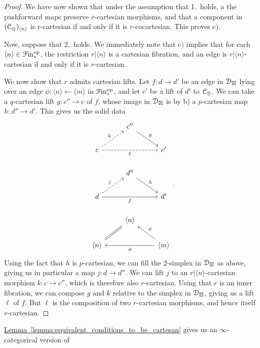 \documentclass[main.tex]{subfiles}
\begin{document}
\begin{proof}
  We have now shown that under the assumption that 1.\ holds, a the pushforward maps preserve $r$-cartesian morphisms, and that a component in $(\mathcal{C}_{\otimes})_{\langle n \rangle}$ is $r$-cartesian if and only if it is $r$-cocartesian. This proves c).

  Now, suppose that 2.\ holds. We immediately note that c) implies that for each $\langle n \rangle \in \mathcal{F}\mathrm{in}_{*}^{\mathrm{op}}$, the restriction $r|\langle n \rangle$ is a cartesian fibration, and an edge is $r|\langle n \rangle$-cartesian if and only if it is $r$-cartesian.

  We now show that $r$ admits cartesian lifts. Let $f\colon d \to d'$ be an edge in $\mathcal{D}_{\boxtimes}$ lying over an edge $\phi\colon \langle n \rangle \leftarrow \langle m \rangle$ in $\mathcal{F}\mathrm{in}_{*}^{\mathrm{op}}$, and let $c'$ be a lift of $d'$ to $\mathcal{C}_{\otimes}$. We can take a $q$-cartesian lift $g\colon c'' \to c$ of $f$, whose image in $\mathcal{D}_{\boxtimes}$ is by b) a $p$-cartesian map $h\colon d'' \to d'$. This gives us the solid data
  \begin{equation*}
    \begin{tikzcd}
      & c''
      \arrow[dr, "g"]
      \\
      c
      \arrow[ur, dashed, "k"]
      \arrow[rr, dashed, swap, "\ell"]
      && c'
      \\
      & d''
      \arrow[dr, "h"]
      \\
      d
      \arrow[ur, dashed, "j"]
      \arrow[rr, swap, "f"]
      && d'
      \\
      & \langle n \rangle
      \arrow[dl, equals]
      \\
      \langle n \rangle
      && \langle m \rangle
      \arrow[ul, swap, "\phi"]
      \arrow[ll, "\phi"]
    \end{tikzcd}.
  \end{equation*}
  Using the fact that $h$ is $p$-cartesian, we can fill the $2$-simplex in $\mathcal{D}_{\boxtimes}$ as above, giving us in particular a map $j\colon d \to d''$. We can lift $j$ to an $r|\langle n \rangle$-cartesian morphism $k\colon c \to c''$, which is therefore also $r$-cartesian. Using that $r$ is an inner fibration, we can compose $g$ and $k$ relative to the simplex in $\mathcal{D}_{\boxtimes}$, giving us a lift $\ell$ of $f$. But $\ell$ is the composition of two $r$-cartesian morphisms, and hence itself $r$-cartesian.
\end{proof}

\hyperref[lemma:equivalent_conditions_to_be_cartesan]{Lemma~\ref*{lemma:equivalent_conditions_to_be_cartesan}} gives us an $\infty$-categorical version of
\end{document}
